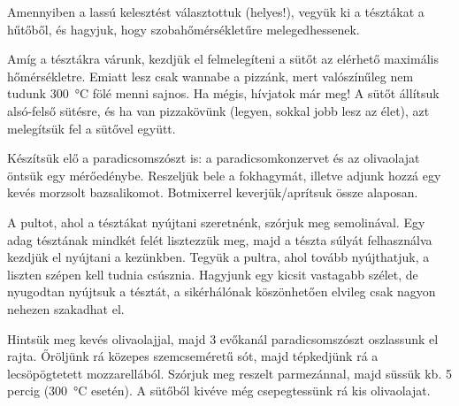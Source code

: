 Amennyiben a lassú kelesztést választottuk (helyes!), vegyük ki a tésztákat a hűtőből, és hagyjuk, hogy szobahőmérsékletűre melegedhessenek.

Amíg a tésztákra várunk, kezdjük el felmelegíteni a sütőt az elérhető maximális hőmérsékletre. Emiatt lesz csak wannabe a pizzánk, mert valószínűleg nem tudunk \qty{300}{\celsius} fölé menni sajnos. Ha mégis, hívjatok már meg! A sütőt állítsuk alsó-felső sütésre, és ha van pizzakövünk (legyen, sokkal jobb lesz az élet), azt melegítsük fel a sütővel együtt.

Készítsük elő a paradicsomszószt is: a paradicsomkonzervet és az olivaolajat öntsük egy mérőedénybe. Reszeljük bele a fokhagymát, illetve adjunk hozzá egy kevés morzsolt bazsalikomot. Botmixerrel keverjük/aprítsuk össze alaposan.

A pultot, ahol a tésztákat nyújtani szeretnénk, szórjuk meg semolinával. Egy adag tésztának mindkét felét lisztezzük meg, majd a tészta súlyát felhasználva kezdjük el nyújtani a kezünkben. Tegyük a pultra, ahol tovább nyújthatjuk, a liszten szépen kell tudnia csúsznia. Hagyjunk egy kicsit vastagabb szélet, de nyugodtan nyújtsuk a tésztát, a sikérhálónak köszönhetően elvileg csak nagyon nehezen szakadhat el.

Hintsük meg kevés olivaolajjal, majd \num{3} evőkanál paradicsomszószt oszlassunk el rajta. Őröljünk rá közepes szemcseméretű sót, majd tépkedjünk rá a lecsöpögtetett mozzarellából. Szórjuk meg reszelt parmezánnal, majd süssük kb. \num{5} percig (\qty{300}{\celsius} esetén). A sütőből kivéve még csepegtessünk rá kis olivaolajat.
